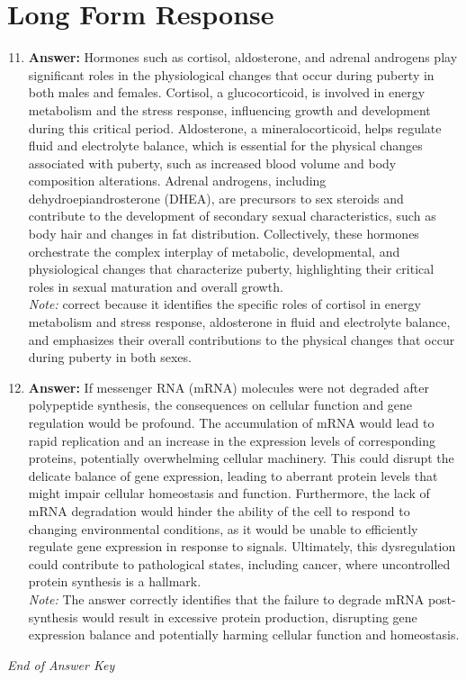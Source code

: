 \documentclass[12pt]{article}
\begin{document}
\section*{Long Form Response}
\begin{enumerate}[label=\arabic*.]
\setcounter{enumi}{10}
\item \textbf{Answer:} Hormones such as cortisol, aldosterone, and adrenal androgens play significant roles in the physiological changes that occur during puberty in both males and females. Cortisol, a glucocorticoid, is involved in energy metabolism and the stress response, influencing growth and development during this critical period. Aldosterone, a mineralocorticoid, helps regulate fluid and electrolyte balance, which is essential for the physical changes associated with puberty, such as increased blood volume and body composition alterations. Adrenal androgens, including dehydroepiandrosterone (DHEA), are precursors to sex steroids and contribute to the development of secondary sexual characteristics, such as body hair and changes in fat distribution. Collectively, these hormones orchestrate the complex interplay of metabolic, developmental, and physiological changes that characterize puberty, highlighting their critical roles in sexual maturation and overall growth.
\\ \textit{Note:} correct because it identifies the specific roles of cortisol in energy metabolism and stress response, aldosterone in fluid and electrolyte balance, and emphasizes their overall contributions to the physical changes that occur during puberty in both sexes.
\item \textbf{Answer:} If messenger RNA (mRNA) molecules were not degraded after polypeptide synthesis, the consequences on cellular function and gene regulation would be profound. The accumulation of mRNA would lead to rapid replication and an increase in the expression levels of corresponding proteins, potentially overwhelming cellular machinery. This could disrupt the delicate balance of gene expression, leading to aberrant protein levels that might impair cellular homeostasis and function. Furthermore, the lack of mRNA degradation would hinder the ability of the cell to respond to changing environmental conditions, as it would be unable to efficiently regulate gene expression in response to signals. Ultimately, this dysregulation could contribute to pathological states, including cancer, where uncontrolled protein synthesis is a hallmark.
\\ \textit{Note:} The answer correctly identifies that the failure to degrade mRNA post-synthesis would result in excessive protein production, disrupting gene expression balance and potentially harming cellular function and homeostasis.
\end{enumerate}

\vfill
\noindent\textit{End of Answer Key}
\end{document}
